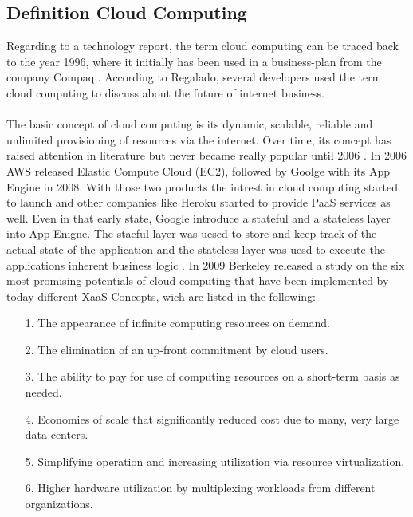 \documentclass[11pt]{article}
\begin{document}
\subsection{Definition Cloud Computing}
Regarding to a technology report, the term cloud computing can be traced back to the year 1996, where it initially has been used in a business-plan from the company Compaq \cite{regalado2011coined}. According to Regalado, several developers used the term cloud computing to discuss about the future of internet business. \\\\
The basic concept of cloud computing is its dynamic, scalable, reliable and unlimited provisioning of resources via the internet. Over time, its concept has raised attention in literature but never became really popular until 2006 \cite{fox2009above}. In 2006 AWS released Elastic Compute Cloud (EC2), followed by Goolge with its App Engine in 2008. With those two products the intrest in cloud computing started to launch and other companies like Heroku started to provide PaaS services as well. Even in that early state, Google introduce a stateful and a stateless layer into App Enigne. The staeful layer was uesed to store and keep track of the actual state of the application and the stateless layer was uesd to execute the applications inherent business logic \cite{fox2009above}. In 2009 Berkeley released a study on the six most promising potentials of cloud computing that have been implemented by today different XaaS-Concepts, wich are listed in the following: \\ 
\begin{itemize}
\item[1.] The appearance of infinite computing resources on demand. 
\item[2.] The elimination of an up-front commitment by cloud users.
\item[3.] The ability to pay for use of computing resources on a short-term basis as needed.
\item[4.] Economies of scale that significantly reduced cost due to many, very large data centers.
\item[5.] Simplifying operation and increasing utilization via resource virtualization.
\item[6.] Higher hardware utilization by multiplexing workloads from different organizations.
\end{itemize}
\end{document}

